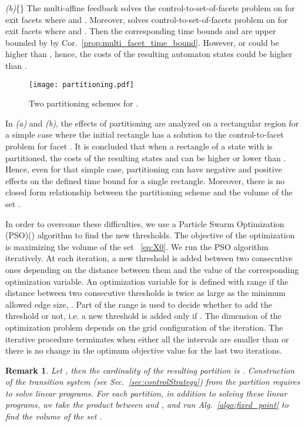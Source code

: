 \documentclass{ifacconf}
\newtheorem{remark}{Remark}
\begin{document}
  
  \emph{(b)}\{{\it }\} The multi-affine feedback  solves the control-to-set-of-facets problem on  for exit facets  where  and . Moreover,  solves control-to-set-of-facets problem on   for exit facets  where  and . Then the corresponding time bounds  and   are upper bounded by  by Cor.~\ref{prop:multi_facet_time_bound}. However,  or  could be higher than , hence, the costs of the resulting automaton states could be higher than .

\begin{figure}
\centering
\texttt{[image: partitioning.pdf]}
\caption{Two partitioning schemes for .}
\label{fig:partition}
\end{figure}
In \emph{(a)} and \emph{(b)}, the effects of partitioning are analyzed on a rectangular region for a simple case where the initial rectangle has a solution to the control-to-facet problem for facet . It is concluded that when a rectangle   of a state  with   is partitioned, the costs of the resulting states  and  can be higher or lower than . 
Hence, even for that simple case, partitioning can have negative and positive effects on the defined time bound for a single rectangle.
Moreover, there is no closed form relationship between the partitioning scheme   and the volume of the set .


In order to overcome these difficulties,
we use a Particle Swarm Optimization (PSO)(\cite{PSOTralea}) algorithm to find the new thresholds. The objective of the optimization is maximizing the volume of the set ~\eqref{eq:X0}. We run the PSO algorithm iteratively.
At each iteration, a new threshold  is added between two consecutive ones  depending on the distance between them and the value of the corresponding optimization variable. An optimization variable for  is defined with range  if the distance between two consecutive thresholds is twice as large as the minimum allowed edge size, . Part of the range  is used to decide whether to add the threshold or not, i.e. a new threshold is added only if . 
The dimension of the optimization problem depends on the grid configuration  of the iteration.
The iterative procedure terminates when either all the intervals are smaller than  or there is no change in the optimum objective value for the last two iterations. 

\begin{remark} Let , then the cardinality of the resulting partition is .
Construction of the transition system  (see Sec.~\ref{sec:controlStrategy}) from the partition  requires to solve  linear programs. For each partition, in addition to solving these linear programs, we take the product between  and , and run Alg.~\ref{algo:fixed_point} to find the volume of the set .
\end{remark}
\end{document}

